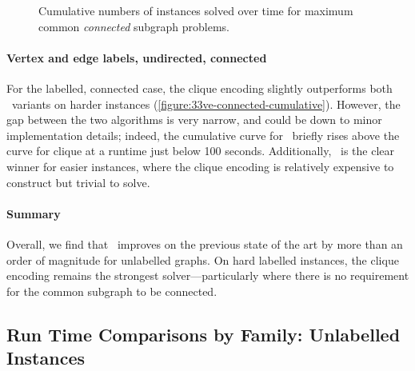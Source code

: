 \begin{figure}[h!]
    \centering
    \par\bigskip
    \caption{Cumulative numbers of instances solved over time for maximum
    common \emph{connected} subgraph problems.}\label{figure:mcs-cumulative-connected}
\end{figure}






\paragraph{Vertex and edge labels, undirected, connected} For the labelled,
connected case, the clique encoding slightly outperforms both \McSplit\
variants on harder instances (\cref{figure:33ve-connected-cumulative}).
However, the gap between the two algorithms is very narrow, and could be
down to minor implementation details; indeed, the cumulative curve for
\McSplit\ briefly rises above the curve for clique at a runtime just below 100
seconds. Additionally, \McSplit\ is the clear winner for easier instances,
where the clique encoding is relatively expensive to construct but trivial to
solve.






\paragraph{Summary} Overall, we find that \McSplit\ improves on the
previous state of the art by more than an order of magnitude for
unlabelled graphs.  On hard labelled instances, the clique encoding remains the
strongest solver---particularly where
there is no requirement for the common subgraph to be connected.





\FloatBarrier


\subsection{Run Time Comparisons by Family: Unlabelled Instances}

